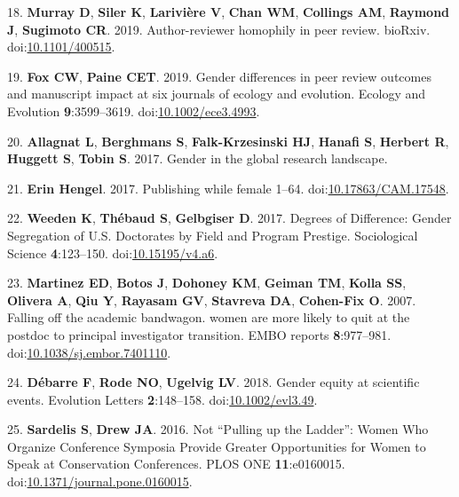 \documentclass[11pt,]{article}
\begin{document}
\hypertarget{ref-Murray400515}{}
18. \textbf{Murray D}, \textbf{Siler K}, \textbf{Larivière V},
\textbf{Chan WM}, \textbf{Collings AM}, \textbf{Raymond J},
\textbf{Sugimoto CR}. 2019. Author-reviewer homophily in peer review.
bioRxiv. doi:\href{https://doi.org/10.1101/400515}{10.1101/400515}.

\hypertarget{ref-fox_gender_2019}{}
19. \textbf{Fox CW}, \textbf{Paine CET}. 2019. Gender differences in
peer review outcomes and manuscript impact at six journals of ecology
and evolution. Ecology and Evolution \textbf{9}:3599--3619.
doi:\href{https://doi.org/10.1002/ece3.4993}{10.1002/ece3.4993}.

\hypertarget{ref-allagnat_gender_2017}{}
20. \textbf{Allagnat L}, \textbf{Berghmans S}, \textbf{Falk-Krzesinski
HJ}, \textbf{Hanafi S}, \textbf{Herbert R}, \textbf{Huggett S},
\textbf{Tobin S}. 2017. Gender in the global research landscape.

\hypertarget{ref-erin_hengel_publishing_2017}{}
21. \textbf{Erin Hengel}. 2017. Publishing while female 1--64.
doi:\href{https://doi.org/10.17863/CAM.17548}{10.17863/CAM.17548}.

\hypertarget{ref-weeden_degrees_2017}{}
22. \textbf{Weeden K}, \textbf{Thébaud S}, \textbf{Gelbgiser D}. 2017.
Degrees of Difference: Gender Segregation of U.S. Doctorates by Field
and Program Prestige. Sociological Science \textbf{4}:123--150.
doi:\href{https://doi.org/10.15195/v4.a6}{10.15195/v4.a6}.

\hypertarget{ref-Martinez2007}{}
23. \textbf{Martinez ED}, \textbf{Botos J}, \textbf{Dohoney KM},
\textbf{Geiman TM}, \textbf{Kolla SS}, \textbf{Olivera A}, \textbf{Qiu
Y}, \textbf{Rayasam GV}, \textbf{Stavreva DA}, \textbf{Cohen-Fix O}.
2007. Falling off the academic bandwagon. women are more likely to quit
at the postdoc to principal investigator transition. EMBO reports
\textbf{8}:977--981.
doi:\href{https://doi.org/10.1038/sj.embor.7401110}{10.1038/sj.embor.7401110}.

\hypertarget{ref-debarre_gender_2018}{}
24. \textbf{Débarre F}, \textbf{Rode NO}, \textbf{Ugelvig LV}. 2018.
Gender equity at scientific events. Evolution Letters
\textbf{2}:148--158.
doi:\href{https://doi.org/10.1002/evl3.49}{10.1002/evl3.49}.

\hypertarget{ref-sardelis_not_2016}{}
25. \textbf{Sardelis S}, \textbf{Drew JA}. 2016. Not ``Pulling up the
Ladder'': Women Who Organize Conference Symposia Provide Greater
Opportunities for Women to Speak at Conservation Conferences. PLOS ONE
\textbf{11}:e0160015.
doi:\href{https://doi.org/10.1371/journal.pone.0160015}{10.1371/journal.pone.0160015}.
\end{document}
